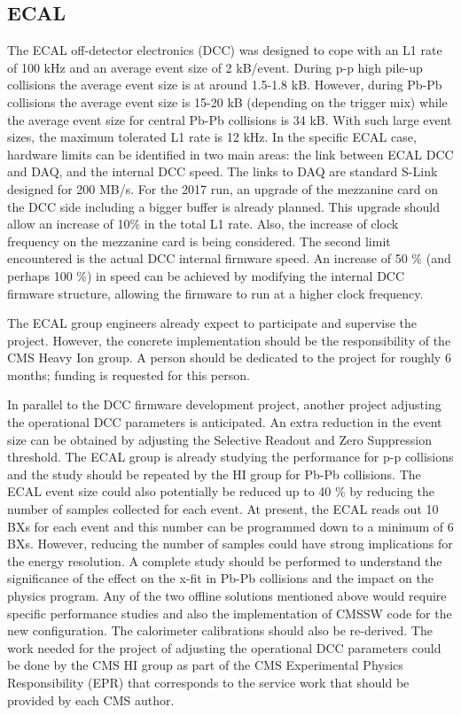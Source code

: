 \subsection{ECAL\label{subsec:ECAL}} 
The ECAL off-detector electronics (DCC) was designed to cope with an L1 rate of 100 kHz and an average event size of 2 kB/event. During p-p high pile-up collisions the average event size is at around 1.5-1.8 kB. However, during Pb-Pb collisions the average event size is 15-20 kB (depending on the trigger mix) while the average event size for central Pb-Pb collisions is 34 kB. With such large event sizes, the maximum tolerated L1 rate is 12 kHz. In the specific ECAL case, hardware limits can be identified in two main areas: the link between ECAL DCC and DAQ, and the internal DCC speed. The links to DAQ are standard S-Link designed for 200 MB/s. For the 2017 run, an upgrade of the mezzanine card on the DCC side including a bigger buffer is already planned. This upgrade should allow an increase of 10\% in the total L1 rate. Also, the increase of clock frequency on the mezzanine card is being considered. The second limit encountered is the actual DCC internal firmware speed. An increase of 50 \% (and perhaps 100 \%) in speed can be achieved by modifying the internal DCC firmware structure, allowing the firmware to run at a higher clock frequency. 

The ECAL group engineers already expect to participate and supervise the project. However, the concrete implementation should be the responsibility of the CMS Heavy Ion group. A person should be dedicated to the project for roughly 6 months; funding is requested for this person.

In parallel to the DCC firmware development project, another project adjusting the operational DCC parameters is anticipated. An extra reduction in the event size can be obtained by adjusting the Selective Readout and Zero Suppression threshold. The ECAL group is already studying the performance for p-p collisions and the study should be repeated by the HI group for Pb-Pb collisions. The ECAL event size could also potentially be reduced up to 40 \% by reducing the number of samples collected for each event. At present, the ECAL reads out 10 BXs for each event and this number can be programmed down to a minimum of 6 BXs. However, reducing the number of samples could have strong implications for the energy resolution. A complete study should be performed to understand the significance of the effect on the x-fit in Pb-Pb collisions and the impact on the physics program. Any of the two offline solutions mentioned above would require specific performance studies and also the implementation of CMSSW code for the new configuration. The calorimeter calibrations should also be re-derived. The work needed for the project of adjusting the operational DCC parameters could be done by the CMS HI group as part of the CMS Experimental Physics Responsibility (EPR) that corresponds to the service work that should be provided by each CMS author.  




